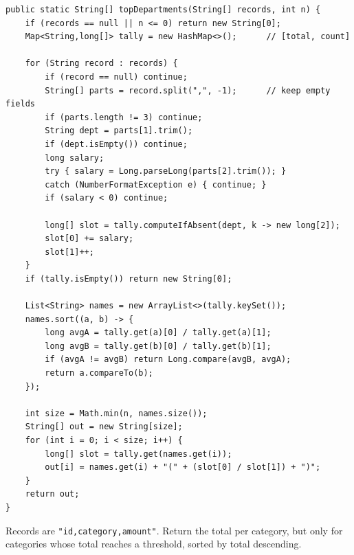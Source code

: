 \solheading
\begin{lstlisting}[style=java]
public static String[] topDepartments(String[] records, int n) {
    if (records == null || n <= 0) return new String[0];
    Map<String,long[]> tally = new HashMap<>();      // [total, count]

    for (String record : records) {
        if (record == null) continue;
        String[] parts = record.split(",", -1);      // keep empty fields
        if (parts.length != 3) continue;
        String dept = parts[1].trim();
        if (dept.isEmpty()) continue;
        long salary;
        try { salary = Long.parseLong(parts[2].trim()); }
        catch (NumberFormatException e) { continue; }
        if (salary < 0) continue;

        long[] slot = tally.computeIfAbsent(dept, k -> new long[2]);
        slot[0] += salary;
        slot[1]++;
    }
    if (tally.isEmpty()) return new String[0];

    List<String> names = new ArrayList<>(tally.keySet());
    names.sort((a, b) -> {
        long avgA = tally.get(a)[0] / tally.get(a)[1];
        long avgB = tally.get(b)[0] / tally.get(b)[1];
        if (avgA != avgB) return Long.compare(avgB, avgA);
        return a.compareTo(b);
    });

    int size = Math.min(n, names.size());
    String[] out = new String[size];
    for (int i = 0; i < size; i++) {
        long[] slot = tally.get(names.get(i));
        out[i] = names.get(i) + "(" + (slot[0] / slot[1]) + ")";
    }
    return out;
}
\end{lstlisting}



Records are \texttt{"id,category,amount"}. Return the total per category, but
only for categories whose total reaches a threshold, sorted by total
descending.


